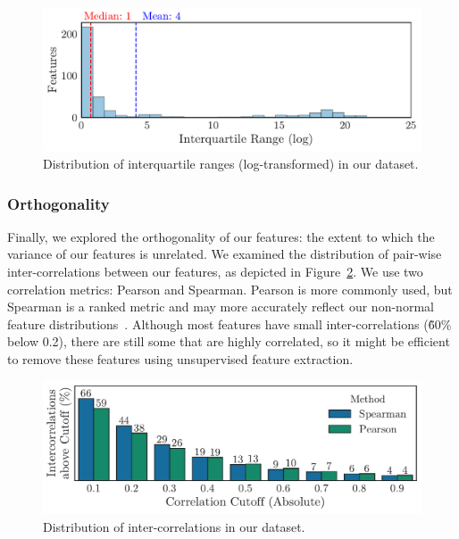 \documentclass[../thesis/thesis.tex]{subfiles}
\begin{document}
\begin{figure}[!htb]
    \centering
    \includegraphics[width=\textwidth]{../figures/design/distribution_ranges}
    \caption[Distribution of interquartile ranges]{Distribution of interquartile ranges (log-transformed) in our dataset.}
    \label{fig:design:scaling}
\end{figure}

\subsubsection{Orthogonality}

Finally, we explored the orthogonality of our features: the extent to which the variance of our features is unrelated. We examined the distribution of pair-wise inter-correlations between our features, as depicted in Figure~\ref{fig:design:orthogonality}. We use two correlation metrics: Pearson and Spearman. Pearson is more commonly used, but Spearman is a ranked metric and may more accurately reflect our non-normal feature distributions~\cite{chok2010}. Although most features have small inter-correlations (\~60\% below 0.2), there are still some that are highly correlated, so it might be efficient to remove these features using unsupervised feature extraction.

\begin{figure}[!htb]
    \centering
    \includegraphics[width=\textwidth]{../figures/design/distribution_orthogonality}
    \caption[Distribution of inter-correlations]{Distribution of inter-correlations in our dataset.}
    \label{fig:design:orthogonality}
\end{figure}
\end{document}
